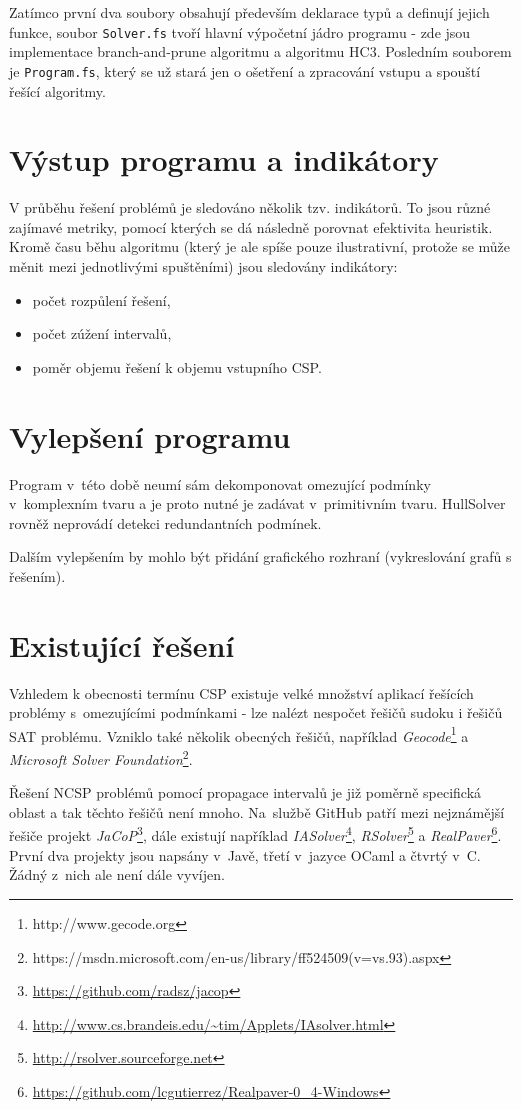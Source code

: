 Zatímco první dva soubory obsahují především deklarace typů a definují jejich funkce, soubor \verb|Solver.fs| tvoří hlavní výpočetní jádro programu - zde jsou implementace branch-and-prune algoritmu a algoritmu HC3. Posledním souborem je \verb|Program.fs|, který se už stará jen o ošetření a zpracování vstupu a spouští řešící algoritmy.

\section{Výstup programu a indikátory}
\label{ch:indicators}
V průběhu řešení problémů je sledováno několik tzv. indikátorů. To jsou různé zajímavé metriky, pomocí kterých se dá následně porovnat efektivita heuristik. Kromě času běhu algoritmu (který je ale spíše pouze ilustrativní, protože se může měnit mezi jednotlivými spuštěními) jsou sledovány indikátory:

\begin{itemize}
    \item počet rozpůlení řešení,
    \item počet zúžení intervalů,
    \item poměr objemu řešení k objemu vstupního CSP.
\end{itemize}





\section{Vylepšení programu}
Program v~této době neumí sám dekomponovat omezující podmínky v~komplexním tvaru a je proto nutné je zadávat v~primitivním tvaru. HullSolver rovněž neprovádí detekci redundantních podmínek.

Dalším vylepšením by mohlo být přidání grafického rozhraní (vykreslování grafů s řešením).






\section{Existující řešení}
Vzhledem k obecnosti termínu CSP existuje velké množství aplikací řešících problémy s~omezujícími podmínkami - lze nalézt nespočet řešičů sudoku i řešičů SAT problému. Vzniklo také několik obecných řešičů, například \emph{Geocode}\footnote{http://www.gecode.org} a \emph{Microsoft Solver Foundation}\footnote{https://msdn.microsoft.com/en-us/library/ff524509(v=vs.93).aspx}.

Řešení NCSP problémů pomocí propagace intervalů je již poměrně specifická oblast a tak těchto řešičů není mnoho. Na~službě GitHub patří mezi nejznámější řešiče projekt \emph{JaCoP}\footnote{\url{https://github.com/radsz/jacop}}, dále existují například \emph{IASolver}\footnote{\url{http://www.cs.brandeis.edu/~tim/Applets/IAsolver.html}}, \emph{RSolver}\footnote{\url{http://rsolver.sourceforge.net}} a \emph{RealPaver}\footnote{\url{https://github.com/lcgutierrez/Realpaver-0\_4-Windows}}. První dva projekty jsou napsány v~Javě, třetí v~jazyce OCaml a čtvrtý v~C. Žádný z~nich ale není dále vyvíjen.
